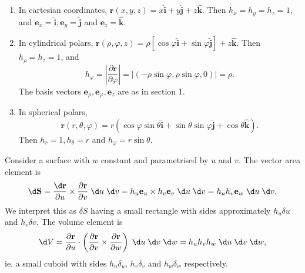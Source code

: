 \documentclass[a4paper]{article}
\begin{document}
\begin{eg}\leavevmode
  \begin{enumerate}
    \item In cartesian coordinates, $\mathbf{r}(x, y, z) = x\hat{\mathbf{i}} + y\hat{\mathbf{j}} + z\hat{\mathbf{k}}$. Then $h_x = h_y = h_z = 1$, and $\mathbf{e}_x = \hat{\mathbf{i}}, \mathbf{e}_y = \hat{\mathbf{j}}$ and $\mathbf{e}_z = \hat{\mathbf{k}}$.
    \item In cylindrical polars, $\mathbf{r}(\rho, \varphi, z) = \rho[\cos \varphi\hat{\mathbf{i}} + \sin \varphi \hat{\mathbf{j}}] + z \hat{\mathbf{k}}$. Then $h_\rho = h_z = 1$, and 
      \[
        h_\varphi = \left|\frac{\partial \mathbf{r}}{\partial \varphi}\right| = |(-\rho \sin\varphi, \rho \sin \varphi, 0)| = \rho.
      \]
      The basis vectors $\mathbf{e}_\rho, \mathbf{e}_\varphi, \mathbf{e}_z$ are as in section 1.
    \item In spherical polars,
      \[
        \mathbf{r}(r, \theta, \varphi) = r(\cos \varphi\sin \theta\hat{\mathbf{i}} + \sin \theta\sin \varphi\hat{\mathbf{j}} + \cos \theta \hat{\mathbf{k}}).
      \]
      Then $h_r = 1, h_\theta = r$ and $h_\varphi = r\sin \theta$.
  \end{enumerate}
\end{eg}

Consider a surface with $w$ constant and parametrised by $u$ and $v$. The vector area element is
\[
  \d \mathbf{S} = \frac{\d \mathbf{r}}{\partial u}\times \frac{\partial \mathbf{r}}{\partial v}\;\d u\;\d v = h_u \mathbf{e}_u \times h_v \mathbf{e}_v \;\d u\;\d v = h_uh_v \mathbf{e}_w \;\d u\;\d v.
\]
We interpret this as $\delta S$ having a small rectangle with sides approximately $h_u \delta u$ and $h_v \delta v$. The volume element is
\[
  \d V = \frac{\partial \mathbf{r}}{\partial u}\cdot \left(\frac{\partial \mathbf{r}}{\partial v}\times \frac{\partial \mathbf{r}}{\partial w}\right)\;\d u\;\d v\;\d w = h_uh_vh_w \;\d u\;\d v\;\d w,
\]
ie. a small cuboid with sides $h_u \delta _u$, $h_v\delta _v$ and $h_w \delta_w$ respectively.
\end{document}
